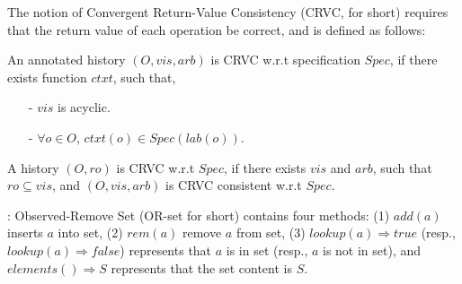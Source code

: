 
The notion of Convergent Return-Value Consistency (CRVC, for short) requires that the return value of each operation be correct, and is defined as follows:

\begin{definition}
\label{definition:strong return value consistency}
An annotated history $(O,\mathit{vis},\mathit{arb})$ is CRVC w.r.t specification $\mathit{Spec}$, if there exists function $\mathit{ctxt}$, such that,

\begin{itemize}
\setlength{\itemsep}{0.5pt}
\item[-] $\mathit{vis}$ is acyclic.

\item[-] $\forall o \in O$, $\mathit{ctxt}(o) \in Spec(\mathit{lab}(o))$.
\end{itemize}

A history $(O,\mathit{ro})$ is CRVC w.r.t $\mathit{Spec}$, if there exists $\mathit{vis}$ and $\mathit{arb}$, such that $\mathit{ro} \subseteq \mathit{vis}$, and $(O,\mathit{vis},\mathit{arb})$ is CRVC consistent w.r.t $\mathit{Spec}$.
\end{definition}


: Observed-Remove Set (OR-set for short) \cite{Shapiro:2011,Bieniusa:2012} contains four methods: (1) $\mathit{add}(a)$ inserts $a$ into set, (2) $\mathit{rem}(a)$ remove $a$ from set, (3) $\mathit{lookup}(a)\Rightarrow \mathit{true}$ (resp., $\mathit{lookup}(a)\Rightarrow \mathit{false}$) represents that $a$ is in set (resp., $a$ is not in set), and $\mathit{elements}() \Rightarrow S$ represents that the set content is $S$.


